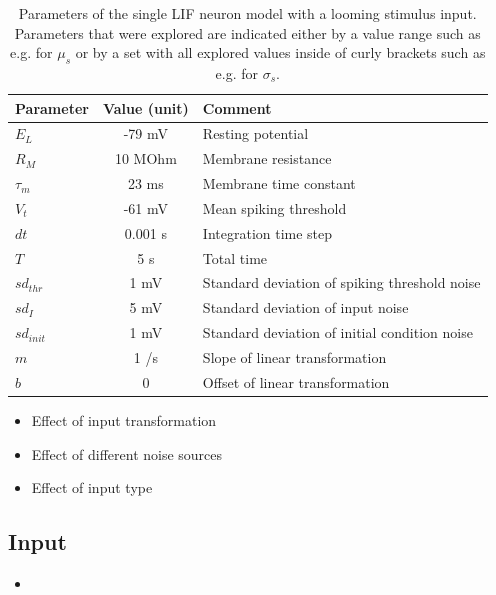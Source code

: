\documentclass[a4paper,10pt,hidelinks]{scrreprt}
\begin{document}
	\begin{table} [!th]
		\begin{center}
			\begin{tabular}{|l|c|p{7cm}|}
				\hline
				\textbf{Parameter} & \textbf{Value (unit)} & \textbf{Comment} \\
				\hline
				$E_L$ & -79 mV & Resting potential\\
				$R_M$ & 10 MOhm & Membrane resistance\\
				$\tau_{m}$ & 23 ms & Membrane time constant\\
				$V_t$ & -61 mV & Mean spiking threshold\\
				$dt$ & 0.001 s & Integration time step\\
				$T$ & 5 s & Total time\\
				$sd_{thr}$ & 1 mV & Standard deviation of spiking threshold noise\\
				$sd_{I}$ & 5 mV & Standard deviation of input noise\\
				$sd_{init}$ & 1 mV & Standard deviation of initial condition noise\\
				$m$ & 1 \textdegree/s  & Slope of linear transformation\\
				$b$ & 0 \textdegree & Offset of linear transformation\\
				\hline
			\end{tabular}
		\end{center}
		\caption{Parameters of the single LIF neuron model with a looming stimulus input. Parameters that were explored are indicated either by a value range such as e.g. for $\mu_s$ or by a set with all explored values inside of curly brackets such as e.g. for $\sigma_s$.}
		\label{tab:neuroparams}
	\end{table}
	\begin{itemize}
		\item Effect of input transformation
		\item Effect of different noise sources
		\item Effect of input type
	\end{itemize}
	\subsection{Input}
	\begin{itemize}
		\item 
	\end{itemize}
\end{document}
